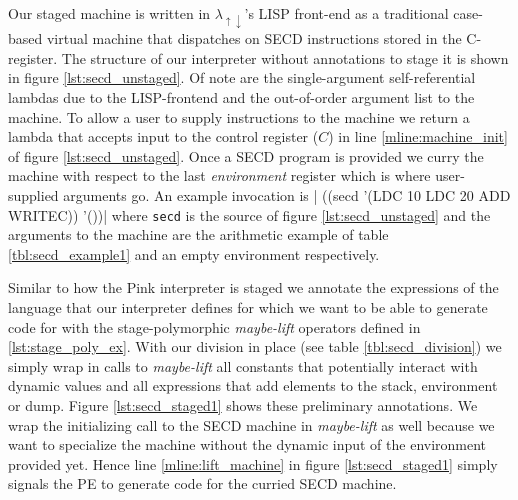 \documentclass[a4paper,12pt,twoside,openright]{report}
\theoremstyle{definition}
\newcommand{\mslang}{$\lambda_{\uparrow\downarrow}$}
\begin{document}
Our staged machine is written in \mslang's LISP front-end as a traditional case-based virtual machine that dispatches on SECD instructions stored in the C-register. The structure of our interpreter without annotations to stage it is shown in figure \ref{lst:secd_unstaged}. Of note are the single-argument self-referential lambdas due to the LISP-frontend and the out-of-order argument list to the machine. To allow a user to supply instructions to the machine we return a lambda that accepts input to the control register ($C$) in line \ref{mline:machine_init} of figure \ref{lst:secd_unstaged}. Once a SECD program is provided we curry the machine with respect to the last \textit{environment} register which is where user-supplied arguments go. An example invocation is |  ((secd '(LDC 10 LDC 20 ADD WRITEC)) '())| where \texttt{secd} is the source of figure \ref{lst:secd_unstaged} and the arguments to the machine are the arithmetic example of table \ref{tbl:secd_example1} and an empty environment respectively.

Similar to how the Pink interpreter is staged \cite{amin2017collapsing} we annotate the expressions of the language that our interpreter defines for which we want to be able to generate code for with the stage-polymorphic \textit{maybe-lift} operators defined in \ref{lst:stage_poly_ex}. With our division in place (see table \ref{tbl:secd_division}) we simply wrap in calls to \textit{maybe-lift} all constants that potentially interact with dynamic values and all expressions that add elements to the stack, environment or dump. Figure \ref{lst:secd_staged1} shows these preliminary annotations. We wrap the initializing call to the SECD machine in \textit{maybe-lift} as well because we want to specialize the machine without the dynamic input of the environment provided yet. Hence line \ref{mline:lift_machine} in figure \ref{lst:secd_staged1} simply signals the PE to generate code for the curried SECD machine.
\end{document}
